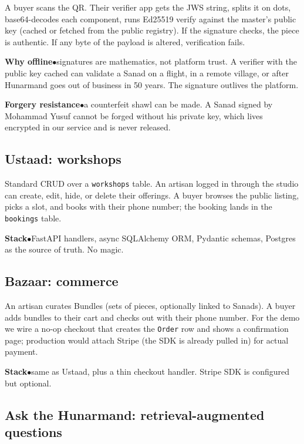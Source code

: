\documentclass[11pt,a4paper]{article}
\newcommand{\stack}[2]{%
  \par\noindent\textbf{\color{walnut}#1}\hspace{0.5em}\textcolor{rouge}{$\bullet$}\hspace{0.5em}\textcolor{faded}{#2}\par
}
\begin{document}
A buyer scans the QR. Their verifier app gets the JWS string, splits
it on dots, base64-decodes each component, runs Ed25519 verify against
the master's public key (cached or fetched from the public registry).
If the signature checks, the piece is authentic. If any byte of the
payload is altered, verification fails.

\stack{Why offline}{signatures are mathematics, not platform trust. A
verifier with the public key cached can validate a Sanad on a flight,
in a remote village, or after Hunarmand goes out of business in 50
years. The signature outlives the platform.}
\stack{Forgery resistance}{a counterfeit shawl can be made. A Sanad
signed by Mohammad Yusuf cannot be forged without his private key,
which lives encrypted in our service and is never released.}

\subsection{Ustaad: workshops}

Standard CRUD over a \texttt{workshops} table. An artisan logged in
through the studio can create, edit, hide, or delete their offerings.
A buyer browses the public listing, picks a slot, and books with their
phone number; the booking lands in the \texttt{bookings} table.

\stack{Stack}{FastAPI handlers, async SQLAlchemy ORM, Pydantic schemas,
Postgres as the source of truth. No magic.}

\subsection{Bazaar: commerce}

An artisan curates Bundles (sets of pieces, optionally linked to
Sanads). A buyer adds bundles to their cart and checks out with their
phone number. For the demo we wire a no-op checkout that creates the
\texttt{Order} row and shows a confirmation page; production would
attach Stripe (the SDK is already pulled in) for actual payment.

\stack{Stack}{same as Ustaad, plus a thin checkout handler. Stripe SDK
is configured but optional.}

\subsection{Ask the Hunarmand: retrieval-augmented questions}
\end{document}
